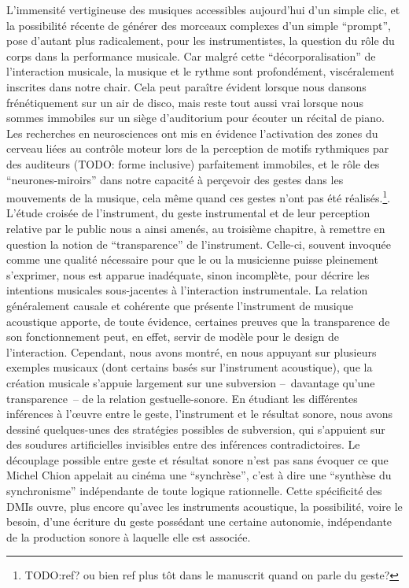 L'immensité vertigineuse des musiques accessibles aujourd'hui d'un simple clic, et la possibilité récente de générer des morceaux complexes d'un simple ``prompt'', pose d'autant plus radicalement, pour les instrumentistes, la question du rôle du corps dans la performance musicale. Car malgré cette ``décorporalisation'' de l'interaction musicale, la musique et le rythme sont profondément, viscéralement inscrites dans notre chair. Cela peut paraître évident lorsque nous dansons frénétiquement sur un air de disco, mais reste tout aussi vrai lorsque nous sommes immobiles sur un siège d'auditorium pour écouter un récital de piano. Les recherches en neurosciences ont mis en évidence l'activation des zones du cerveau liées au contrôle moteur lors de la perception de motifs rythmiques par des auditeurs (TODO: forme inclusive) parfaitement immobiles, et le rôle des ``neurones-miroirs'' dans notre capacité à perçevoir des gestes dans les mouvements de la musique, cela même quand ces gestes n'ont pas été réalisés.\footnote{TODO:ref? ou bien ref plus tôt dans le manuscrit quand on parle du geste?}.\\


\noindent L’étude croisée de l’instrument, du geste instrumental et de leur perception relative par le public nous a ainsi amenés, au troisième chapitre, à remettre en question la notion de ``transparence'' de l’instrument. Celle-ci, souvent invoquée comme une qualité nécessaire pour que le ou la musicienne puisse pleinement s’exprimer, nous est apparue inadéquate, sinon incomplète, pour décrire les intentions musicales sous-jacentes à l’interaction instrumentale. La relation généralement causale et cohérente que présente l’instrument de musique acoustique apporte, de toute évidence, certaines preuves que la transparence de son fonctionnement peut, en effet, servir de modèle pour le design de l’interaction. Cependant, nous avons montré, en nous appuyant sur plusieurs exemples musicaux (dont certains basés sur l’instrument acoustique), que la création musicale s’appuie largement sur une subversion --~davantage qu’une transparence~-- de la relation gestuelle-sonore. En étudiant les différentes inférences à l’œuvre entre le geste, l’instrument et le résultat sonore, nous avons dessiné quelques-unes des stratégies possibles de subversion, qui s’appuient sur des soudures artificielles invisibles entre des inférences contradictoires. Le découplage possible entre geste et résultat sonore n'est pas sans évoquer ce que Michel Chion appelait au cinéma une ``synchrèse'', c'est à dire une ``synthèse du synchronisme'' indépendante de toute logique rationnelle\cite{chion_audio-vision:_2013}. Cette spécificité des \glspl{DMI} ouvre, plus encore qu'avec les instruments acoustique, la possibilité, voire le besoin, d'une écriture du geste possédant une certaine autonomie, indépendante de la production sonore à laquelle elle est associée. %

